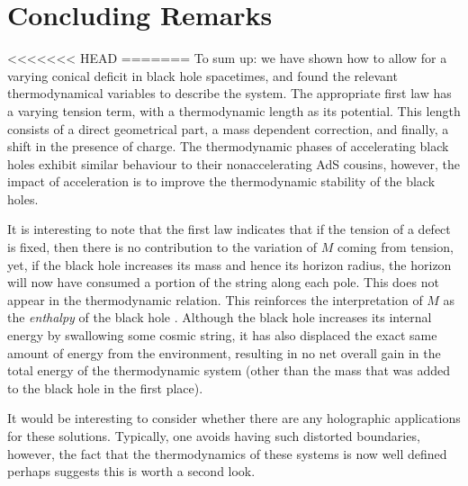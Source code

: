\documentclass[
twoside,
openright,
frontopenright,
]{dmathesis}
\begin{document}
\chapter{Concluding Remarks}


<<<<<<< HEAD
=======
To sum up: we have shown how to allow for a varying conical deficit
in black hole spacetimes, and found the relevant thermodynamical 
variables to describe the system. The appropriate first law has a 
varying tension term, with a thermodynamic length as its potential. 
This length consists of a direct geometrical part, a mass dependent correction, 
and finally, a shift in the presence of charge. The thermodynamic phases of
accelerating black holes exhibit similar behaviour to their nonaccelerating 
AdS cousins, however, the impact of acceleration is to improve the thermodynamic
stability of the black holes.

It is interesting to note that the first law indicates that if the tension of a
defect is fixed, then there is no contribution to the variation of $M$ coming
from tension, yet, if the black hole increases its mass and hence its horizon
radius, the horizon will now have consumed a portion of the string along each
pole.  This does not appear in the thermodynamic relation. This reinforces the
interpretation of $M$ as the {\it enthalpy} of the black hole
\cite{Kastor:2009wy}.  Although the black hole increases its internal energy by
swallowing some cosmic string, it has also displaced the exact same amount of
energy from the environment, resulting in no net overall gain in the total
energy of the thermodynamic system (other than the mass that was added to the
black hole in the first place).

It would be interesting to consider whether there are any holographic
applications for these solutions. Typically, one avoids having such distorted
boundaries, however, the fact that the thermodynamics of these systems is now
well defined perhaps suggests this is worth a second look.
\end{document}
